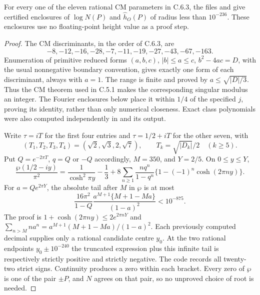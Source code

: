 \begin{proposition}\label{ari:C.6.5}
For every one of the eleven rational CM parameters in C.6.3,
the files  and
 give certified enclosures of
$\log N(P)$ and $\widehat h_O(P)$ of radius less than
$10^{-236}$. These enclosures use no floating-point height
value as a proof step.
\end{proposition}
\begin{proof}
The CM discriminants, in the order of C.6.3, are
\[
 -8,-12,-16,-28,-7,-11,-19,-27,-43,-67,-163.
\]
Enumeration of primitive reduced forms
$(a,b,c)$, $|b|\le a\le c$, $b^2-4ac=D$, with the usual
nonnegative boundary convention, gives exactly one form of
each discriminant, always with $a=1$.
The range is finite and proved by $a\le\sqrt{|D|/3}$.
Thus the CM theorem used in C.5.1 makes the corresponding
singular modulus an integer. The Fourier enclosures below
place it within $1/4$ of the specified $j$, proving its
identity, rather than only numerical closeness. Exact class
polynomials were also computed independently in
 and its output.

Write $\tau=iT$ for the first four entries and
$\tau=1/2+iT$ for the other seven, with
\[
 (T_1,T_2,T_3,T_4)=(\sqrt2,\sqrt3,2,\sqrt7),\qquad
 T_k=\sqrt{|D_k|}/2\quad(k\ge5).
\]
Put $Q=e^{-2\pi T}$, $q=Q$ or $-Q$ accordingly,
$M=350$, and $Y=2/5$. On $0\le y\le Y$,
\begin{equation}\label{ari:eq:ch-wp-bracket}
 \frac{\wp(1/2-iy)}{\pi^2}
 =\frac1{\cosh^2\pi y}-\frac13+
 8\sum_{n\ge1}\frac{nq^n}{1-q^n}
                 \{1-(-1)^n\cosh(2\pi ny)\}.
\end{equation}
For $a=Qe^{2\pi Y}$, the absolute tail after $M$ in
$\wp$ is at most
\[
 \frac{16\pi^2}{1-Q}
 \frac{a^{M+1}\{M+1-Ma\}}{(1-a)^2}<10^{-875}.
\]
The proof is $1+\cosh(2\pi ny)\le2e^{2\pi nY}$ and
$\sum_{n>M}na^n=a^{M+1}(M+1-Ma)/(1-a)^2$.
Each previously computed decimal supplies only a rational
candidate centre $y_0$. At the two rational endpoints
$y_0\pm10^{-240}$ the truncated expression plus this
infinite tail is respectively strictly positive and strictly
negative. The code records all twenty-two strict signs.
Continuity produces a zero within each bracket. Every zero
of $\wp$ is one of the pair $\pm P$, and $N$ agrees on
that pair, so no unproved choice of root is needed.


\end{proof}
